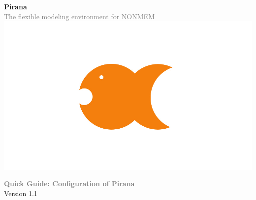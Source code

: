 \documentclass[a4,10pt]{article} \usepackage[pdftex]{graphicx}
\renewcommand{\emph}[1]{\textbf{\textcolor{Grey}{#1}}}
\begin{document}
{\centering
  \vspace{-100pt}
  \textbf{
    \textcolor{PiranaOrange}{\Large Pirana}
  }\\
  \vspace{5pt} \scriptsize \textcolor{Grey}{The flexible modeling
    environment for NONMEM} \\ \normalsize
  \vspace{12pt}
  \hspace{5pt}\includegraphics[scale=0.14]{images/pirana_logo.jpg}\\
  \vspace{18pt}

  {\large
    \emph{Quick Guide: Configuration of Pirana }  \vspace{10pt} \\
        Version 1.1
  }

}
\vspace{25pt}


\end{document}
